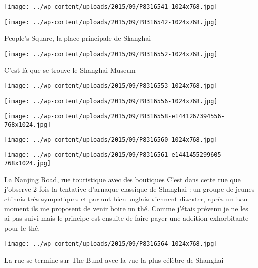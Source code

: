  \newline
\centerline{\texttt{[image: ../wp-content/uploads/2015/09/P8316541-1024x768.jpg]} } 
 \newline
 \newline
\centerline{\texttt{[image: ../wp-content/uploads/2015/09/P8316542-1024x768.jpg]} } 
 \newline
 People's Square, la place principale de Shanghai \newline
 \newline
\centerline{\texttt{[image: ../wp-content/uploads/2015/09/P8316552-1024x768.jpg]} } 
 \newline
 C'est là que se trouve le Shanghai Museum \newline
 \newline
\centerline{\texttt{[image: ../wp-content/uploads/2015/09/P8316553-1024x768.jpg]} } 
 \newline
 \newline
\centerline{\texttt{[image: ../wp-content/uploads/2015/09/P8316556-1024x768.jpg]} } 
 \newline
 \newline
\centerline{\texttt{[image: ../wp-content/uploads/2015/09/P8316558-e1441267394556-768x1024.jpg]} } 
 \newline
 \newline
\centerline{\texttt{[image: ../wp-content/uploads/2015/09/P8316560-1024x768.jpg]} } 
 \newline
 \newline
\centerline{\texttt{[image: ../wp-content/uploads/2015/09/P8316561-e1441455299605-768x1024.jpg]} } 
 \newline
 La Nanjing Road, rue touristique avec des boutiques \newline
 C'est dans cette rue que j'observe 2 fois la tentative d'arnaque classique de Shanghai : un groupe de jeunes chinois très sympatiques et parlant bien anglais viennent discuter, après un bon moment ils me proposent de venir boire un thé. Comme j'étais prévenu je ne les ai pas suivi mais le principe est ensuite de faire payer une addition exhorbitante pour le thé. \newline
 \newline
\centerline{\texttt{[image: ../wp-content/uploads/2015/09/P8316564-1024x768.jpg]} } 
 \newline
 La rue se termine sur The Bund avec la vue la plus célèbre de Shanghai \newline
